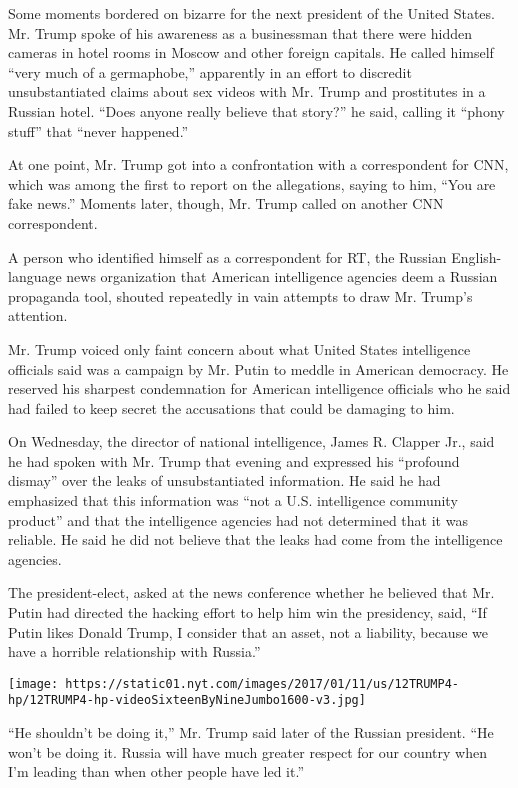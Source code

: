 Some moments bordered on bizarre for the next president of the United
States. Mr. Trump spoke of his awareness as a businessman that there
were hidden cameras in hotel rooms in Moscow and other foreign capitals.
He called himself ``very much of a germaphobe,'' apparently in an effort
to discredit unsubstantiated claims about sex videos with Mr. Trump and
prostitutes in a Russian hotel. ``Does anyone really believe that
story?'' he said, calling it ``phony stuff'' that ``never happened.''

At one point, Mr. Trump got into a confrontation with a correspondent
for CNN, which was among the first to report on the allegations, saying
to him, ``You are fake news.'' Moments later, though, Mr. Trump called
on another CNN correspondent.

A person who identified himself as a correspondent for RT, the Russian
English-language news organization that American intelligence agencies
deem a Russian propaganda tool, shouted repeatedly in vain attempts to
draw Mr. Trump's attention.

Mr. Trump voiced only faint concern about what United States
intelligence officials said was a campaign by Mr. Putin to meddle in
American democracy. He reserved his sharpest condemnation for American
intelligence officials who he said had failed to keep secret the
accusations that could be damaging to him.

On Wednesday, the director of national intelligence, James R. Clapper
Jr., said he had spoken with Mr. Trump that evening and expressed his
``profound dismay'' over the leaks of unsubstantiated information. He
said he had emphasized that this information was ``not a U.S.
intelligence community product'' and that the intelligence agencies had
not determined that it was reliable. He said he did not believe that the
leaks had come from the intelligence agencies.

The president-elect, asked at the news conference whether he believed
that Mr. Putin had directed the hacking effort to help him win the
presidency, said, ``If Putin likes Donald Trump, I consider that an
asset, not a liability, because we have a horrible relationship with
Russia.''

\texttt{[image: https://static01.nyt.com/images/2017/01/11/us/12TRUMP4-hp/12TRUMP4-hp-videoSixteenByNineJumbo1600-v3.jpg]}

``He shouldn't be doing it,'' Mr. Trump said later of the Russian
president. ``He won't be doing it. Russia will have much greater respect
for our country when I'm leading than when other people have led it.''

